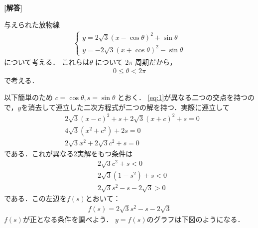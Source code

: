 \documentclass[../../main.tex]{subfiles}
\begin{document}
\begin{oframed}
  
\end{oframed}

{\bf [解答]}

与えられた放物線
\begin{align}
  \begin{cases}
    y=2\sqrt{3}(x-\cos\theta)^2+\sin\theta \\
    y=-2\sqrt{3}(x+\cos\theta)^2-\sin\theta
  \end{cases} \label{eq:1}
\end{align}
について考える．
これらは$\theta$ について $2\pi$ 周期だから，
\begin{align}
  0 \le \theta < 2\pi \label{eq:2}
\end{align}
で考える．

以下簡単のため $c = \cos\theta, s = \sin\theta$ とおく．
\cref{eq:1}が異なる二つの交点を持つので，$y$を消去して連立した二次方程式が二つの解を持つ．実際に連立して
\begin{align}
  & 2\sqrt{3}(x-c)^2 + s + 2\sqrt{3}(x+c)^2 + s = 0 \\
  & 4\sqrt{3}(x^2 + c^2) + 2s = 0 \\
  & 2\sqrt{3}x^2 + 2\sqrt{3}c^2 + s = 0
\end{align}
である．これが異なる2実解をもつ条件は
\begin{align}
  & 2\sqrt{3}c^2 + s < 0 \\
  & 2\sqrt{3}(1-s^2) + s < 0 \\
  & 2\sqrt{3}s^2 - s - 2\sqrt{3} > 0 \label{eq:3}
\end{align}
である．この左辺を$f(s)$とおいて：
\begin{align}
  f(s) = 2\sqrt{3}s^2 - s - 2\sqrt{3} \label{eq:4}
\end{align}
$f(s)$が正となる条件を調べよう．
$y=f(s)$のグラフは下図のようになる．
\end{document}
